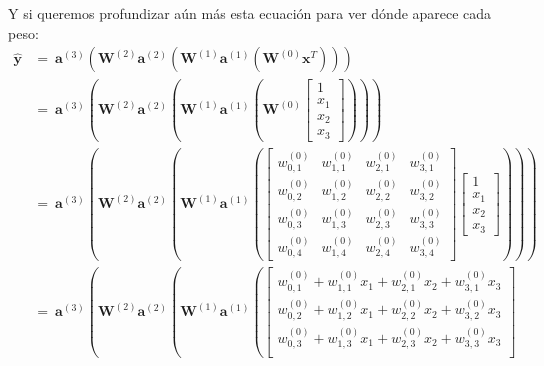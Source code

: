 \documentclass[../../main.tex]{subfiles}
\begin{document}
Y si queremos profundizar aún más esta ecuación para ver dónde aparece cada peso:
\begin{align*}
    \bm{\hat{y}}
    &=\ \bm{a}^{(3)} \left(
        \mathbf{W}^{(2)} \bm{a}^{(2)} \left(
            \mathbf{W}^{(1)} \bm{a}^{(1)} \left( \mathbf{W}^{(0)} \bm{x}^T \right)
        \right)
    \right) \\
    &=\ \bm{a}^{(3)} \left(
            \mathbf{W}^{(2)} \bm{a}^{(2)} \left(
                \mathbf{W}^{(1)} \bm{a}^{(1)} \left(
                    \mathbf{W}^{(0)} \begin{bmatrix} 1 \\ x_1 \\ x_2 \\ x_3 \end{bmatrix}
            \right)
        \right)
    \right) \\
    &=\ \bm{a}^{(3)} \left(
            \mathbf{W}^{(2)} \bm{a}^{(2)} \left(
                \mathbf{W}^{(1)} \bm{a}^{(1)} \left(
                    \begin{bmatrix}
                        w_{0,1}^{(0)} & w_{1,1}^{(0)} & w_{2,1}^{(0)} & w_{3,1}^{(0)} \\
                        w_{0,2}^{(0)} & w_{1,2}^{(0)} & w_{2,2}^{(0)} & w_{3,2}^{(0)} \\
                        w_{0,3}^{(0)} & w_{1,3}^{(0)} & w_{2,3}^{(0)} & w_{3,3}^{(0)} \\
                        w_{0,4}^{(0)} & w_{1,4}^{(0)} & w_{2,4}^{(0)} & w_{3,4}^{(0)}
                    \end{bmatrix}
                    \begin{bmatrix} 1 \\ x_1 \\ x_2 \\ x_3 \end{bmatrix}
            \right)
        \right)
    \right) \\
    &=\ \bm{a}^{(3)} \left(
            \mathbf{W}^{(2)} \bm{a}^{(2)} \left(
                \mathbf{W}^{(1)} \bm{a}^{(1)} \left(
                    \begin{bmatrix}
                        w_{0,1}^{(0)} + w_{1,1}^{(0)} x_1 + w_{2,1}^{(0)} x_2 + w_{3,1}^{(0)} x_3 \\
                        w_{0,2}^{(0)} + w_{1,2}^{(0)} x_1 + w_{2,2}^{(0)} x_2 + w_{3,2}^{(0)} x_3 \\
                        w_{0,3}^{(0)} + w_{1,3}^{(0)} x_1 + w_{2,3}^{(0)} x_2 + w_{3,3}^{(0)} x_3 \\

\end{bmatrix}
\end{align*}
\end{document}
